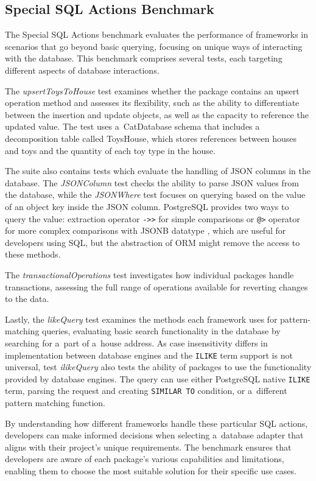 \subsection*{Special SQL Actions Benchmark}

The Special SQL Actions benchmark evaluates the performance of frameworks in
scenarios that go beyond basic querying, focusing on unique ways of interacting
with the database. This benchmark comprises several tests, each targeting
different aspects of database interactions.

The \textit{upsertToysToHouse} test examines whether the package contains an
upsert operation method and assesses its flexibility, such as the ability to
differentiate between the insertion and update objects, as well as the capacity
to reference the updated value. The test uses a~CatDatabase schema that includes
a decomposition table called ToysHouse, which stores references between houses
and toys and the quantity of each toy type in the house.

The suite also contains tests which evaluate the handling of JSON columns in the
database. The \textit{JSONColumn} test checks the ability to parse JSON values
from the database, while the \textit{JSONWhere} test focuses on querying based
on the value of an object key inside the JSON column. PostgreSQL provides two
ways to query the value: extraction operator \texttt{->>} for simple comparisons
or \texttt{@>} operator for more complex comparisons with JSONB datatype
\cite{postgres-json}, which are useful for developers using SQL, but the
abstraction of ORM might remove the access to these methods.

The \textit{transactionalOperations} test investigates how individual packages
handle transactions, assessing the full range of operations available for
reverting changes to the data.

Lastly, the \textit{likeQuery} test examines the methods each framework uses for
pattern-matching queries, evaluating basic search functionality in the database
by searching for a~part of a~house address. As case insensitivity differs in
implementation between database engines and the \texttt{ILIKE} term support is
not universal, test \textit{ilikeQuery} also tests the ability of packages to
use the functionality provided by database engines. The query can use either
PostgreSQL native \texttt{ILIKE} term, parsing the request and creating
\texttt{SIMILAR TO} condition, or a~different pattern matching function. 

By understanding how different frameworks handle these particular SQL actions,
developers can make informed decisions when selecting a~database adapter that
aligns with their project's unique requirements. The benchmark ensures that
developers are aware of each package's various capabilities and limitations,
enabling them to choose the most suitable solution for their specific use cases.

